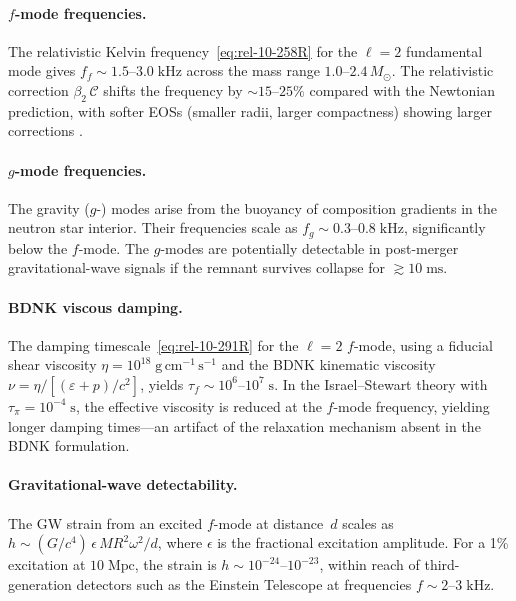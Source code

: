 \paragraph{$f$-mode frequencies.}
The relativistic Kelvin frequency~\eqref{eq:rel-10-258R}
for the $\ell = 2$ fundamental mode gives
$f_{f} \sim 1.5$--$3.0\;\mathrm{kHz}$ across the mass range
$1.0$--$2.4\,M_{\odot}$.  The relativistic correction
$\beta_{2}\,\mathcal{C}$ shifts the frequency by
$\sim 15$--$25\%$ compared with the Newtonian prediction,
with softer EOSs (smaller radii, larger compactness) showing
larger corrections \citep{Radice2018}.

\paragraph{$g$-mode frequencies.}
The gravity ($g$-) modes arise from the buoyancy of composition
gradients in the neutron star interior.  Their frequencies scale as
$f_{g} \sim 0.3$--$0.8\;\mathrm{kHz}$, significantly below the
$f$-mode.  The $g$-modes are potentially detectable in post-merger
gravitational-wave signals if the remnant survives collapse for
$\gtrsim 10\;\mathrm{ms}$.

\paragraph{BDNK viscous damping.}
The damping timescale~\eqref{eq:rel-10-291R} for the $\ell = 2$
$f$-mode, using a fiducial shear viscosity
$\eta = 10^{18}\;\mathrm{g\,cm^{-1}\,s^{-1}}$ and the BDNK
kinematic viscosity $\nu = \eta/[(\varepsilon + p)/c^{2}]$,
yields $\tau_{f} \sim 10^{6}$--$10^{7}\;\mathrm{s}$.  In the
Israel--Stewart theory with $\tau_{\pi} = 10^{-4}\;\mathrm{s}$,
the effective viscosity is reduced at the $f$-mode frequency,
yielding longer damping times---an artifact of the relaxation
mechanism absent in the BDNK formulation.

\paragraph{Gravitational-wave detectability.}
The GW strain from an excited $f$-mode at distance~$d$ scales as
$h \sim (G/c^{4})\,\epsilon\,MR^{2}\omega^{2}/d$, where
$\epsilon$ is the fractional excitation amplitude.  For a 1\%
excitation at $10\;\mathrm{Mpc}$, the strain is
$h \sim 10^{-24}$--$10^{-23}$, within reach of third-generation
detectors such as the Einstein Telescope at frequencies
$f \sim 2$--$3\;\mathrm{kHz}$.


